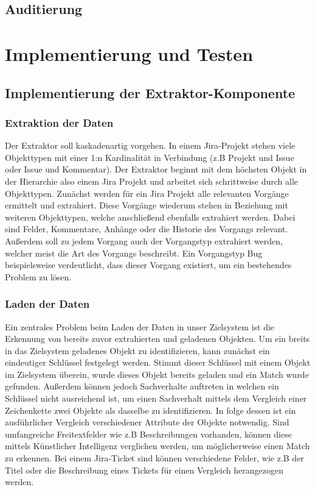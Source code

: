 \documentclass[10pt]{article}
\begin{document}
\subsection{Auditierung}
\section{Implementierung und Testen}
\subsection{Implementierung der Extraktor-Komponente}
\subsubsection{Extraktion der Daten}
Der Extraktor soll kaskadenartig vorgehen. In einem Jira-Projekt stehen viele Objekttypen mit einer 1:n Kardinalität in Verbindung (z.B Projekt und Issue oder Issue und Kommentar). Der Extraktor beginnt mit dem höchsten Objekt in der Hierarchie also einem Jira Projekt und arbeitet sich schrittweise durch alle Objekttypen. Zunächst werden für ein Jira Projekt alle relevanten Vorgänge ermittelt und extrahiert. Diese Vorgänge wiederum stehen in Beziehung mit weiteren Objekttypen, welche anschließend ebenfalls extrahiert werden. Dabei sind Felder, Kommentare, Anhänge oder die Historie des Vorgangs relevant. Außerdem soll zu jedem Vorgang auch der Vorgangstyp extrahiert werden, welcher meist die Art des Vorgangs beschreibt. Ein Vorgangstyp Bug beispielsweise verdeutlicht, dass dieser Vorgang existiert, um ein bestehendes Problem zu lösen.
\subsubsection{Laden der Daten}
Ein zentrales Problem beim Laden der Daten in unser Zielsystem ist die Erkennung von bereits zuvor extrahierten und geladenen Objekten. Um ein breits in das Zielsystem geladenes Objekt zu identifizieren, kann zunächst ein eindeutiger Schlüssel festgelegt werden. Stimmt dieser Schlüssel mit einem Objekt im Zielsystem überein, wurde dieses Objekt bereits geladen und ein Match wurde gefunden. Außerdem können jedoch Sachverhalte auftreten in welchen ein Schlüssel nicht ausreichend ist, um einen Sachverhalt mittels dem Vergleich einer Zeichenkette zwei Objekte als dasselbe zu identifizieren. In folge dessen ist ein ausführlicher Vergleich verschiedener Attribute der Objekte notwendig. Sind umfangreiche Freitextfelder wie z.B Beschreibungen vorhanden, können diese mittels Künstlicher Intelligenz verglichen werden, um möglicherweise einen Match zu erkennen. Bei einem Jira-Ticket sind können verschiedene Felder, wie z.B der Titel oder die Beschreibung eines Tickets für einen Vergleich herangezogen werden.
\end{document}
